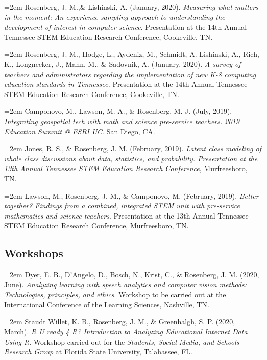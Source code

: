 \documentclass[
  11pt,
]{article}
\begin{document}
\hangindent=2em Rosenberg, J. M.,\& Lishinski, A. (January, 2020).
\emph{Measuring what matters in-the-moment: An experience sampling
approach to understanding the development of interest in computer
science}. Presentation at the 14th Annual Tennessee STEM Education
Research Conference, Cookeville, TN.

\hangindent=2em Rosenberg, J. M., Hodge, L., Aydeniz, M., Schmidt, A.
Lishinski, A., Rich, K., Longnecker, J., Mann. M., \& Sadovnik, A.
(January, 2020). \emph{A survey of teachers and administrators regarding
the implementation of new K-8 computing education standards in
Tennessee.} Presentation at the 14th Annual Tennessee STEM Education
Research Conference, Cookeville, TN.

\hangindent=2em Camponovo, M., Lawson, M. A., \& Rosenberg, M. J. (July,
2019). \emph{Integrating geospatial tech with math and science
pre-service teachers. 2019 Education Summit @ ESRI UC}. San Diego, CA.

\hangindent=2em Jones, R. S., \& Rosenberg, J. M. (February, 2019).
\emph{Latent class modeling of whole class discussions about data,
statistics, and probability. Presentation at the 13th Annual Tennessee
STEM Education Research Conference}, Murfreesboro, TN.

\hangindent=2em Lawson, M., Rosenberg, J. M., \& Camponovo, M.
(February, 2019). \emph{Better together? Findings from a combined,
integrated STEM unit with pre-service mathematics and science teachers}.
Presentation at the 13th Annual Tennessee STEM Education Research
Conference, Murfreesboro, TN.

\hypertarget{workshops}{%
\subsection{Workshops}\label{workshops}}

\hangindent=2em Dyer, E. B., D'Angelo, D., Bosch, N., Krist, C., \&
Rosenberg, J. M. (2020, June). \emph{Analyzing learning with speech
analytics and computer vision methods: Technologies, principles, and
ethics}. Workshop to be carried out at the International Conference of
the Learning Sciences, Nashville, TN.

\hangindent=2em Staudt Willet, K. B., Rosenberg, J. M., \& Greenhalgh,
S. P. (2020, March). \emph{R U ready 4 R? Introduction to Analyzing
Educational Internet Data Using R}. Workshop carried out for the
\emph{Students, Social Media, and Schools Research Group} at Florida
State University, Talahassee, FL.
\end{document}
